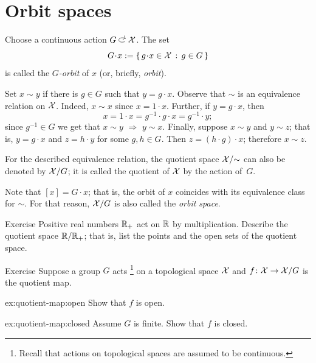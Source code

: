 \section{Orbit spaces}

Choose a continuous action $G\acts \c{X}$.
The set
\[G\cdot x:=\set{g\cdot x\in \c{X}}{g\in G}\]
is called the \emph{$G$-orbit} of $x$ (or, briefly, {}\emph{orbit}).

Set $x\sim y$ if there is $g\in G$ such that $y=g\cdot x$.
Observe that $\sim$ is an equivalence relation on $\mathcal{X}$.
Indeed,
$x\sim x$ since $x=1\cdot x$.
Further, if $y=g\cdot x$, then
\[x=1\cdot x=g^{-1}\cdot g\cdot  x=g^{-1}\cdot y;\] since $g^{-1}\in G$ we get that $x\sim y$
$\Rightarrow$
$y\sim x$.
Finally, suppose $x\sim y$ and $y\sim z$;
that is, $y=g\cdot x$ and $z=h\cdot y$ for some $g,h\in G$.
Then $z=(h\cdot g)\cdot x$; therefore $x\sim z$.

For the described equivalence relation, the quotient space $\mathcal{X}/{\sim}$ can also be denoted by $\mathcal{X}/G$;
it is called the quotient of $\mathcal{X}$ by the action of~$G$.

Note that $[x]=G\cdot x$; that is, the orbit of $x$ coincides with its equivalence class for $\sim$.
For that reason, $\mathcal{X}/G$ is also called the \emph{orbit space}.

\begin{thm}{Exercise}\label{ex:R/R}
Positive real numbers $\mathbb{R}_+$ act on $\mathbb{R}$ by multiplication.
Describe the quotient space $\mathbb{R}/\mathbb{R}_+$;
that is, list the points and the open sets of the quotient space.

\end{thm}

\begin{thm}[!]{Exercise}\label{ex:quotient-map}
Suppose a group $G$ acts%
\footnote{Recall that actions on topological spaces are assumed to be continuous.}
on a topological space $\mathcal{X}$ and $f\colon\mathcal{X}\to \mathcal{X}/G$ is the quotient map.
\begin{subthm}{ex:quotient-map:open}
Show that $f$ is open.
\end{subthm}
\begin{subthm}{ex:quotient-map:closed}
Assume $G$ is finite.
Show that $f$ is closed.
\end{subthm}

\end{thm}
